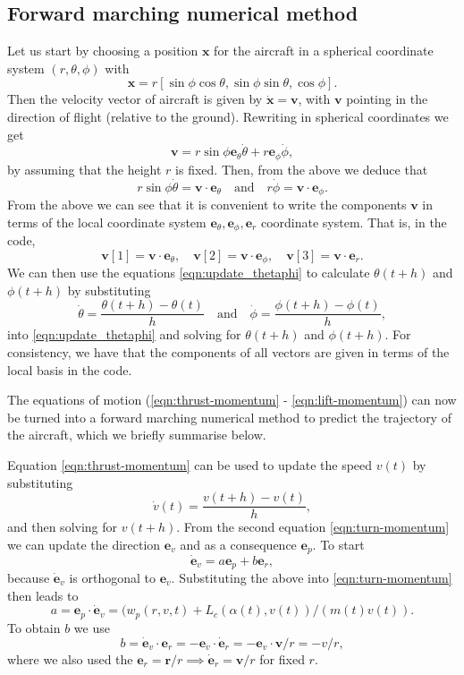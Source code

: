 \documentclass{article}
\renewcommand{\vec}[1]{\boldsymbol{#1}}
\begin{document}
\subsection{Forward marching numerical method}

Let us start by choosing a position $\vec x$ for the aircraft in a spherical coordinate system $(r,\theta,\phi)$ with
\[
\vec x = r [ \sin \phi \cos \theta, \sin \phi \sin \theta,   \cos \phi].
\]
Then the velocity vector of aircraft is given by $\dot{\vec x} = \vec v$, with $\vec v$ pointing in the direction of flight (relative to the ground). Rewriting in spherical coordinates we get
\[
\vec v = r \sin \phi  {\vec e_\theta} \dot \theta + r  {\vec e_\phi} \dot \phi, 
\]
by assuming that the height $r$ is fixed. Then, from the above we deduce that
\begin{equation} \label{eqn:update_thetaphi}
    r \sin \phi \dot \theta = \vec v \cdot {\vec e}_\theta  \quad \text{and} \quad 
r \dot \phi = \vec v \cdot {\vec e}_\phi.
\end{equation}
From the above we can see that it is convenient to write the components $\vec v$ in terms of the local coordinate system ${\vec e}_\theta, {\vec e}_\phi, {\vec e}_r$ coordinate system. That is, in the code, 
\[
\vec v[1] = \vec v \cdot {\vec e}_\theta, \quad 
\vec v[2] = \vec v \cdot {\vec e}_\phi, 
\quad 
\vec v[3] = \vec v \cdot {\vec e}_r.
\]
We can then use the equations \eqref{eqn:update_thetaphi}  to calculate $\theta(t+h)$ and $\phi(t+h)$ by substituting 
\[
\dot \theta = \frac{ \theta(t+h) - \theta(t)}{h} \quad \text{and} \quad 
\dot \phi = \frac{ \phi(t+h) - \phi(t)}{h},
\]
into \eqref{eqn:update_thetaphi} and solving for $\theta(t+h)$ and $\phi(t+h)$. For consistency, we have that the components of all vectors are given in terms of the local basis in the code.

The equations of motion (\ref{eqn:thrust-momentum} - \ref{eqn:lift-momentum}) can now be turned into a forward marching numerical method to predict the trajectory of the aircraft, which we briefly summarise below.

Equation \eqref{eqn:thrust-momentum} can be used to update the speed $v(t)$ by substituting
\[
\dot { v}(t) = \frac{{v}(t+h) - {v}(t)}{h},
\]
and then solving for ${v}(t+h)$. From the second equation \eqref{eqn:turn-momentum} we can update the direction $\vec {e}_v$ and as a consequence $\vec e_p$. To start
\[
\dot{\vec e}_v = a {\vec e}_p + b {\vec e}_r, 
\]
because $\dot {\vec e}_v$ is orthogonal to ${\vec e}_v$. Substituting the above into \eqref{eqn:turn-momentum} then leads to
\begin{equation}
 a =  {\vec{e}}_p \cdot \dot{\vec{e}}_v =  (w_p(r,v,t) + L_c(\alpha(t),v(t) ) / (m(t) v(t)).
\end{equation}
To obtain $b$ we use 
\begin{equation}
b = \dot{\vec e}_v \cdot  {\vec e}_r = - {\vec e}_v \cdot  \dot {\vec e}_r =  - {\vec e}_v \cdot  {\vec v} / r = - v / r,    
\end{equation}
where we also used the $\vec e_r = \vec r / r \implies \dot{\vec e}_r = \vec v / r$ for fixed $r$.
\end{document}
